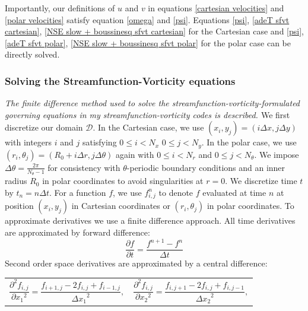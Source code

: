 \documentclass{article}
\begin{document}
Importantly, our definitions of $u$ and $v$ in equations \ref{cartesian velocities} and \ref{polar velocities} satisfy equation \ref{omega} and \ref{psi}. Equations \ref{psi}, \ref{adeT sfvt cartesian}, \ref{NSE slow + boussinesq sfvt cartesian} for the Cartesian case and \ref{psi}, \ref{adeT sfvt polar}, \ref{NSE slow + boussinesq sfvt polar} for the polar case can be directly solved.

\subsubsection*{Solving the Streamfunction-Vorticity equations}
{\it{The finite difference method used to solve the streamfunction-vorticity-formulated governing equations in my streamfunction-vorticity codes is described. }}
\vspace{0.3cm}
\newline
\noindent We first discretize our domain $\mathcal{D}$. In the Cartesian case, we use $(x_i,y_j)=(i \Delta x, j \Delta y)
$ with integers $i$ and $j$ satisfying $0\leq i < N_x$ $0 \leq j < N_y$. In the polar case, we use $(r_i, \theta_j)= (R_0 
+ i \Delta r, j 
\Delta \theta)$ again with  $0 \leq i < N_r$ and $0 \leq j < N_{\theta}$. We impose $\Delta \theta = \frac{2 \pi}
{N_{\theta} - 1}$ for consistency with $\theta$-periodic boundary conditions and an inner radius $R_0$ in polar 
coordinates to avoid 
singularities at $r=0$. We discretize time $t$ by $t_n = n \Delta t$. For a function $f$, we use 
$f^n_{i,j}$ to denote $f$ evaluated at time $n$ at position $(x_i,y_j)$ in Cartesian coordinates or $(r_i, \theta_j)$ in 
polar coordinates. 
\newline
To approximate derivatives we use a finite difference approach. All time derivatives are approximated by forward difference:
\begin{equation}
	\frac{\partial f}{\partial t} = \frac{f^{n+1} - f^{n}}{\Delta t}
	\label{forward time difference}
\end{equation}
Second order space derivatives are approximated by a central difference:
\begin{tabularx}{\textwidth}{XX}
\begin{equation}
	\frac{\partial^2 f_{i,j}}{\partial {x_1}^2} = \frac{f_{i+1,j} - 2 f_{i,j} + f_{i-1,j}}{{\Delta x_1}^2},
\end{equation}
    &
\begin{equation}
	\frac{\partial^2 f_{i,j}}{\partial {x_2}^2} = \frac{f_{i,j+1} - 2 f_{i,j} + f_{i,j-1}}{{\Delta x_2}^2},
\end{equation}
\end{tabularx}\par
\end{document}
